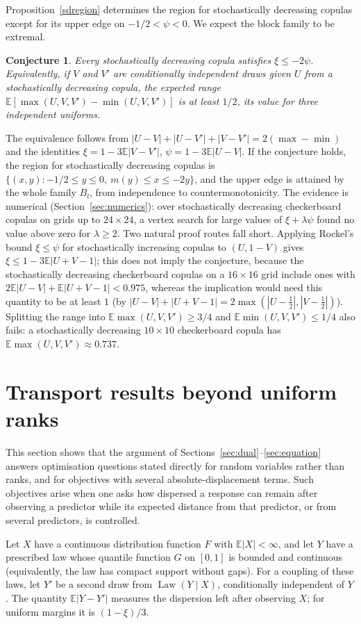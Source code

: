 \documentclass[11pt,a4paper]{article}
\newtheorem{conjecture}[theorem]{Conjecture}
\theoremstyle{remark}
\newcommand{\E}{\mathbb E}
\newcommand{\1}{\mathbf 1}
\DeclareMathOperator{\Law}{Law}
\begin{document}
Proposition~\ref{sdregion} determines the region for stochastically decreasing copulas except for its upper edge on $-1/2<\psi<0$. We expect the block family to be extremal.

\begin{conjecture}\label{sdconj}
Every stochastically decreasing copula satisfies $\xi\le-2\psi$. Equivalently, if $V$ and $V'$ are conditionally independent draws given $U$ from a stochastically decreasing copula, the expected range $\E[\max(U,V,V')-\min(U,V,V')]$ is at least $1/2$, its value for three independent uniforms.
\end{conjecture}
The equivalence follows from $|U-V|+|U-V'|+|V-V'|=2(\max-\min)$ and the identities $\xi=1-3\E|V-V'|$, $\psi=1-3\E|U-V|$. If the conjecture holds, the region for stochastically decreasing copulas is $\{(x,y):-1/2\le y\le0,\ m(y)\le x\le-2y\}$, and the upper edge is attained by the whole family $B_l$, from independence to countermonotonicity. The evidence is numerical (Section~\ref{sec:numerics}): over stochastically decreasing checkerboard copulas on grids up to $24\times24$, a vertex search for large values of $\xi+\lambda\psi$ found no value above zero for $\lambda\ge2$. Two natural proof routes fall short. Applying Rockel's bound $\xi\le\psi$ for stochastically increasing copulas to $(U,1-V)$ gives $\xi\le1-3\E|U+V-1|$; this does not imply the conjecture, because the stochastically decreasing checkerboard copulas on a $16\times16$ grid include ones with $2\E|U-V|+\E|U+V-1|<0.975$, whereas the implication would need this quantity to be at least $1$ (by $|U-V|+|U+V-1|=2\max(|U-\tfrac12|,|V-\tfrac12|)$). Splitting the range into $\E\max(U,V,V')\ge3/4$ and $\E\min(U,V,V')\le1/4$ also fails: a stochastically decreasing $10\times10$ checkerboard copula has $\E\max(U,V,V')\approx0.737$.

\section{Transport results beyond uniform ranks}\label{sec:transport}
This section shows that the argument of Sections~\ref{sec:dual}--\ref{sec:equation} answers optimisation questions stated directly for random variables rather than ranks, and for objectives with several absolute-displacement terms. Such objectives arise when one asks how dispersed a response can remain after observing a predictor while its expected distance from that predictor, or from several predictors, is controlled.

Let $X$ have a continuous distribution function $F$ with $\E|X|<\infty$, and let $Y$ have a prescribed law whose quantile function $G$ on $[0,1]$ is bounded and continuous (equivalently, the law has compact support without gaps). For a coupling of these laws, let $Y'$ be a second draw from $\Law(Y\mid X)$, conditionally independent of $Y$. The quantity $\E|Y-Y'|$ measures the dispersion left after observing $X$; for uniform margins it is $(1-\xi)/3$.
\end{document}
